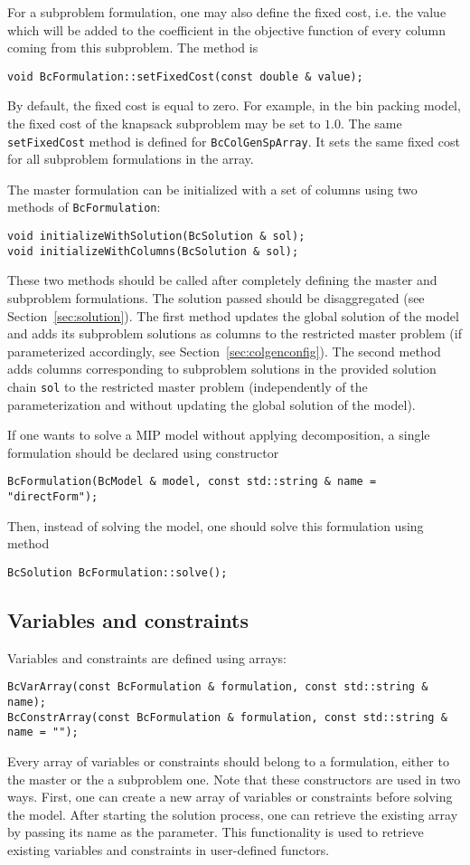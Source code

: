 \documentclass[10pt,a4paper]{article}
\begin{document}
For a subproblem formulation, one may also define the fixed cost, i.e. the value which will be added to the coefficient
in the objective function of every column coming from this subproblem. The method is 
\begin{lstlisting}
void BcFormulation::setFixedCost(const double & value);
\end{lstlisting}
By default, the fixed cost is equal to zero. For example, in the bin packing model, the fixed cost of the knapsack
subproblem may be set to $1.0$. The same \verb+setFixedCost+ method is defined for \verb+BcColGenSpArray+. It sets the
same fixed cost for all subproblem formulations in the array.

The master formulation can be initialized with a set of columns using two methods of \verb+BcFormulation+: 
\begin{lstlisting}
void initializeWithSolution(BcSolution & sol);
void initializeWithColumns(BcSolution & sol);
\end{lstlisting}
These two methods should be called after completely defining the master and subproblem formulations. The solution passed
should be disaggregated (see Section~\ref{sec:solution}). The first method updates the global solution of the model
and adds its subproblem solutions as columns to the restricted master problem (if parameterized accordingly, see
Section~\ref{sec:colgenconfig}). The second method adds columns corresponding to subproblem solutions in the provided
solution chain \verb+sol+ to the restricted master problem (independently of the parameterization and without updating
the global solution of the model).

If one wants to solve a MIP model without applying decomposition, a single formulation should be declared using
constructor
\begin{lstlisting}
BcFormulation(BcModel & model, const std::string & name = "directForm");
\end{lstlisting}
Then, instead of solving the model, one should solve this formulation using method
\begin{lstlisting}
BcSolution BcFormulation::solve(); 
\end{lstlisting}

\subsection{Variables and constraints}
\label{sec:varconstr}

Variables and constraints are defined using arrays:
\begin{lstlisting}
BcVarArray(const BcFormulation & formulation, const std::string & name);
BcConstrArray(const BcFormulation & formulation, const std::string & name = "");
\end{lstlisting}
Every array of variables or constraints should belong to a formulation, either to the master or the a subproblem
one. Note that these constructors are used in two ways. First, one can create a new array of variables or constraints
before solving the model. After starting the solution process, one can retrieve the existing array by passing its name
as the parameter.  This functionality is used to retrieve existing variables and constraints in user-defined functors.
\end{document}

